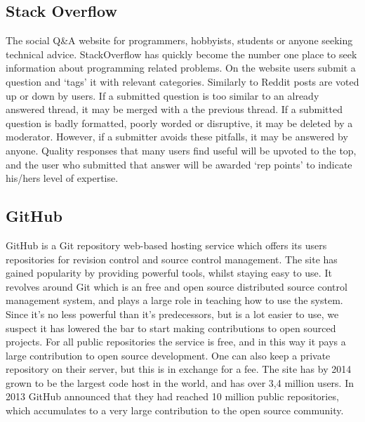 \documentclass[a4paper,11pt]{article} %
\begin{document}
\subsection{Stack Overflow}

The social Q\&A website for programmers, hobbyists, students or anyone
seeking technical advice. StackOverflow has quickly become the number one
place to seek information about programming related problems. On the website
users submit a question and ‘tags’ it with relevant categories.  Similarly
to Reddit posts are voted up or down by users. If a submitted question is
too similar to an already answered thread, it may be merged with a the
previous thread. If a submitted question is badly formatted, poorly worded
or disruptive, it may be deleted by a moderator.  However, if a submitter
avoids these pitfalls, it may be answered by anyone. Quality responses that
many users find useful will be upvoted to the top, and the user who
submitted that answer will be awarded ‘rep points’ to indicate his/hers
level of expertise.


\subsection{GitHub}

GitHub is a Git repository web-based hosting service which offers its users
repositories for revision control and source control management. The site
has gained popularity by providing powerful tools, whilst staying easy to
use. It revolves around Git which is an free and open source distributed
source control management system, and plays a large role in teaching how to
use the system. Since it’s no less powerful than it’s predecessors, but is a
lot easier to use, we suspect it has lowered the bar to start making
contributions to open sourced projects. For all public repositories the
service is free, and in this way it pays a large contribution to open source
development. One can also keep a private repository on their server, but
this is in exchange for a fee. The site has by 2014 grown to be the largest
code host in the world, and has over 3,4 million users. In 2013 GitHub
announced that they had reached 10 million public repositories, which
accumulates to a very large contribution to the open source community.
\end{document}
